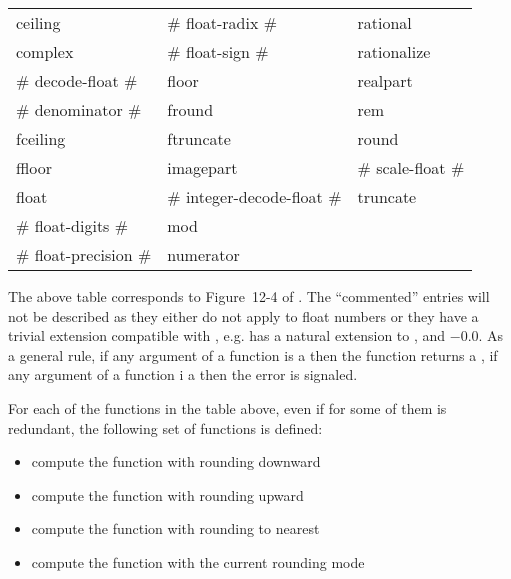 \documentclass[../../Operations.tex]{subfiles}
\begin{document}
\label{sect:transc-ops}

\begin{tt}
  \begin{tabular}{lll}
    ceiling & \# float-radix \# & rational\\
    complex &  \# float-sign \# &  rationalize\\
    \# decode-float \# & floor  &  realpart\\
    \# denominator \# &  fround &  rem\\
    fceiling & ftruncate &  round\\
    ffloor &  imagepart & \# scale-float \#\\
    float & \# integer-decode-float \# & truncate\\
    \# float-digits \# & mod & \\
    \# float-precision \# & numerator & \\
  \end{tabular}
\end{tt}

\vspace*{3mm}

\noindent
The above table corresponds to Figure~12-4 of \cite{1996:ANSIHyperSpec}.
The ``commented'' entries will not be described as they either do not
apply to float numbers or they have a trivial extension
compatible with \cite{2012:LIA1,2001:LIA2,2004:LIA3}, e.g. 
has a natural extension to ,
 and $-0.0$. As a general rule, if any argument of a
function is a  then the function returns a
, if any argument of a function i a
 then the
 error is signaled.

\noindent
For each of the functions in the table above, even if for some of them is
redundant, the following set of functions is defined:
\begin{itemize}
\item {} compute the function with rounding downward
\item {} compute the function with rounding upward
\item {} compute the function with rounding to nearest
\item {} compute the function with the current rounding mode
\end{itemize}
\vspace*{3mm}




\end{document}

